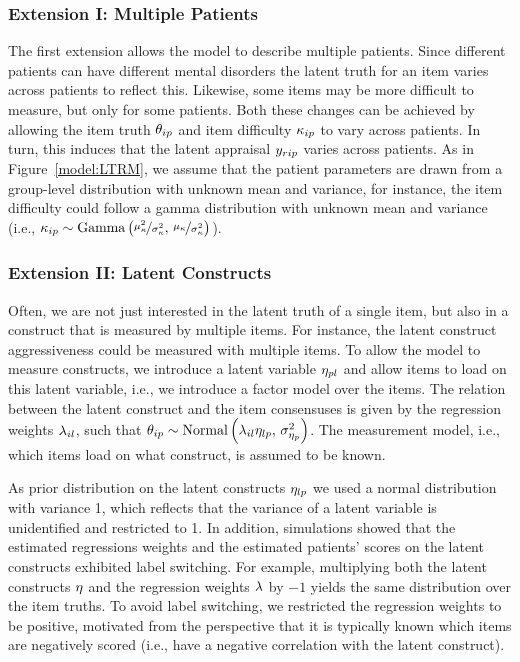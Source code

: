 \documentclass[a4paper]{article}
\begin{document}
\subsubsection*{Extension I: Multiple Patients}
The first extension allows the model to describe multiple patients. Since different patients can have different mental disorders the latent truth for an item varies across patients to reflect this. Likewise, some items may be more difficult to measure, but only for some patients. Both these changes can be achieved by allowing the item truth $\theta_{ip}$ and item difficulty $\kappa_{ip}$ to vary across patients. In turn, this induces that the latent appraisal $y_{rip}$ varies across patients. As in Figure~\ref{model:LTRM}, we assume that the patient parameters are drawn from a group-level distribution with unknown mean and variance, for instance, the item difficulty could follow a gamma distribution with unknown mean and variance (i.e., $\kappa_{ip} \sim \text{Gamma}\left(\nicefrac{\mu_\kappa^2}{\sigma_\kappa^2},\,\nicefrac{\mu_\kappa}{\sigma_\kappa^2}\right)$).

\subsubsection*{Extension II: Latent Constructs}
Often, we are not just interested in the latent truth of a single item, but also in a construct that is measured by multiple items. For instance, the latent construct aggressiveness could be measured with multiple items. To allow the model to measure constructs, we introduce a latent variable $\eta_{pl}$ and allow items to load on this latent variable, i.e., we introduce a factor model over the items. The relation between the latent construct and the item consensuses is given by the regression weights $\lambda_{il}$, such that $\theta_{ip} \sim \text{Normal}\left(\lambda_{il}\eta_{lp},\,\sigma^2_{\eta_{p}}\right)$. The measurement model, i.e., which items load on what construct, is assumed to be known.

As prior distribution on the latent constructs $\eta_{lp}$ we used a normal distribution with variance 1, which reflects that the variance of a latent variable is unidentified and restricted to 1. In addition, simulations showed that the estimated regressions weights and the estimated patients' scores on the latent constructs exhibited label switching. For example, multiplying both the latent constructs $\eta$ and the regression weights $\lambda$ by $-1$ yields the same distribution over the item truths. To avoid label switching, we restricted the regression weights to be positive, motivated from the perspective that it is typically known which items are negatively scored (i.e., have a negative correlation with the latent construct).
\end{document}
